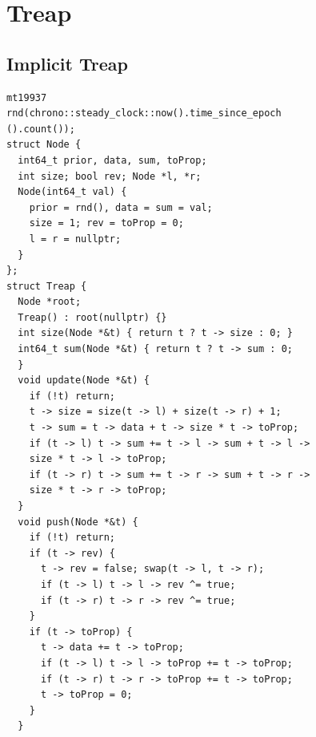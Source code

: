 \section{Treap}
\subsection{Implicit Treap}
\begin{verbatim}
mt19937
rnd(chrono::steady_clock::now().time_since_epoch
().count());
struct Node {
  int64_t prior, data, sum, toProp;
  int size; bool rev; Node *l, *r;
  Node(int64_t val) {
    prior = rnd(), data = sum = val;
    size = 1; rev = toProp = 0;
    l = r = nullptr;
  }
};
struct Treap {
  Node *root;
  Treap() : root(nullptr) {}
  int size(Node *&t) { return t ? t -> size : 0; }
  int64_t sum(Node *&t) { return t ? t -> sum : 0;
  }
  void update(Node *&t) {
    if (!t) return;
    t -> size = size(t -> l) + size(t -> r) + 1;
    t -> sum = t -> data + t -> size * t -> toProp;
    if (t -> l) t -> sum += t -> l -> sum + t -> l ->
    size * t -> l -> toProp;
    if (t -> r) t -> sum += t -> r -> sum + t -> r ->
    size * t -> r -> toProp;
  }
  void push(Node *&t) {
    if (!t) return;
    if (t -> rev) {
      t -> rev = false; swap(t -> l, t -> r);
      if (t -> l) t -> l -> rev ^= true;
      if (t -> r) t -> r -> rev ^= true;
    }
    if (t -> toProp) {
      t -> data += t -> toProp;
      if (t -> l) t -> l -> toProp += t -> toProp;
      if (t -> r) t -> r -> toProp += t -> toProp;
      t -> toProp = 0;
    }
  }
\end{verbatim}
